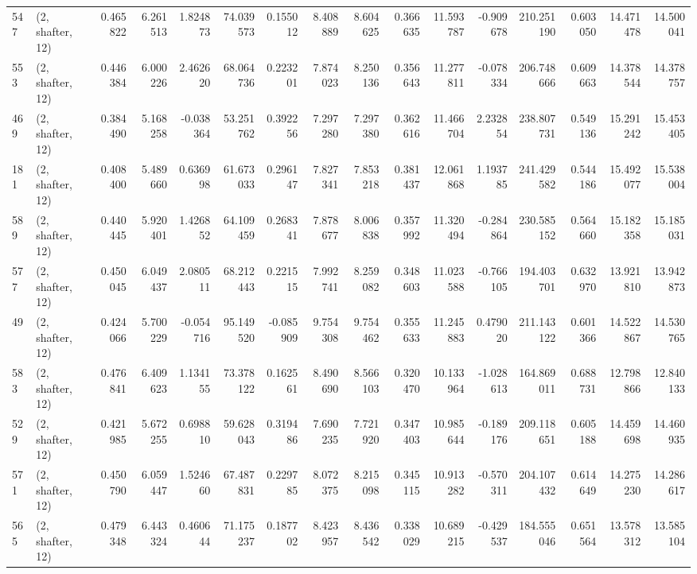 \begin{tabular}{llrrrrrrrrrrrrrr}
547 &  (2, shafter, 12) &   0.465822 &   6.261513 &   1.824873 &    74.039573 &   0.155012 &   8.408889 &   8.604625 &  0.366635 &  11.593787 &  -0.909678 &   210.251190 &  0.603050 &  14.471478 &  14.500041 \\
553 &  (2, shafter, 12) &   0.446384 &   6.000226 &   2.462620 &    68.064736 &   0.223201 &   7.874023 &   8.250136 &  0.356643 &  11.277811 &  -0.078334 &   206.748666 &  0.609663 &  14.378544 &  14.378757 \\
469 &  (2, shafter, 12) &   0.384490 &   5.168258 &  -0.038364 &    53.251762 &   0.392256 &   7.297280 &   7.297380 &  0.362616 &  11.466704 &   2.232854 &   238.807731 &  0.549136 &  15.291242 &  15.453405 \\
181 &  (2, shafter, 12) &   0.408400 &   5.489660 &   0.636998 &    61.673033 &   0.296147 &   7.827341 &   7.853218 &  0.381437 &  12.061868 &   1.193785 &   241.429582 &  0.544186 &  15.492077 &  15.538004 \\
589 &  (2, shafter, 12) &   0.440445 &   5.920401 &   1.426852 &    64.109459 &   0.268341 &   7.878677 &   8.006838 &  0.357992 &  11.320494 &  -0.284864 &   230.585152 &  0.564660 &  15.182358 &  15.185031 \\
577 &  (2, shafter, 12) &   0.450045 &   6.049437 &   2.080511 &    68.212443 &   0.221515 &   7.992741 &   8.259082 &  0.348603 &  11.023588 &  -0.766105 &   194.403701 &  0.632970 &  13.921810 &  13.942873 \\
49  &  (2, shafter, 12) &   0.424066 &   5.700229 &  -0.054716 &    95.149520 &  -0.085909 &   9.754308 &   9.754462 &  0.355633 &  11.245883 &   0.479020 &   211.143122 &  0.601366 &  14.522867 &  14.530765 \\
583 &  (2, shafter, 12) &   0.476841 &   6.409623 &   1.134155 &    73.378122 &   0.162561 &   8.490690 &   8.566103 &  0.320470 &  10.133964 &  -1.028613 &   164.869011 &  0.688731 &  12.798866 &  12.840133 \\
529 &  (2, shafter, 12) &   0.421985 &   5.672255 &   0.698810 &    59.628043 &   0.319486 &   7.690235 &   7.721920 &  0.347403 &  10.985644 &  -0.189176 &   209.118651 &  0.605188 &  14.459698 &  14.460935 \\
571 &  (2, shafter, 12) &   0.450790 &   6.059447 &   1.524660 &    67.487831 &   0.229785 &   8.072375 &   8.215098 &  0.345115 &  10.913282 &  -0.570311 &   204.107432 &  0.614649 &  14.275230 &  14.286617 \\
565 &  (2, shafter, 12) &   0.479348 &   6.443324 &   0.460644 &    71.175237 &   0.187702 &   8.423957 &   8.436542 &  0.338029 &  10.689215 &  -0.429537 &   184.555046 &  0.651564 &  13.578312 &  13.585104 \\

\end{tabular}
